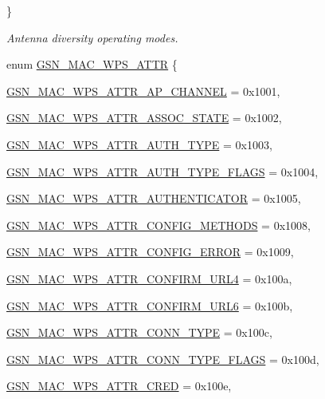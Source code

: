 \begin{DoxyCompactItemize}
 \}
\begin{DoxyCompactList}\small\item\em Antenna diversity operating modes. \end{DoxyCompactList}\item 
enum \hyperlink{a00642_ga0ae19d69a0b381d883890df8a7812414}{GSN\_\-MAC\_\-WPS\_\-ATTR} \{ \par
\hyperlink{a00642_gga0ae19d69a0b381d883890df8a7812414ae0e4f98b1e9f93fab112823a40124cf9}{GSN\_\-MAC\_\-WPS\_\-ATTR\_\-AP\_\-CHANNEL} =  0x1001, 
\par
\hyperlink{a00642_gga0ae19d69a0b381d883890df8a7812414a14a9ece3989389a193ba8952c6e54a49}{GSN\_\-MAC\_\-WPS\_\-ATTR\_\-ASSOC\_\-STATE} =  0x1002, 
\par
\hyperlink{a00642_gga0ae19d69a0b381d883890df8a7812414a82abc540504b8e5abd3d3284d1be3691}{GSN\_\-MAC\_\-WPS\_\-ATTR\_\-AUTH\_\-TYPE} =  0x1003, 
\par
\hyperlink{a00642_gga0ae19d69a0b381d883890df8a7812414a82a50e93477f656efe36c78bee9853ae}{GSN\_\-MAC\_\-WPS\_\-ATTR\_\-AUTH\_\-TYPE\_\-FLAGS} =  0x1004, 
\par
\hyperlink{a00642_gga0ae19d69a0b381d883890df8a7812414a6db708b7b9456aa0954847a56a87c950}{GSN\_\-MAC\_\-WPS\_\-ATTR\_\-AUTHENTICATOR} =  0x1005, 
\par
\hyperlink{a00642_gga0ae19d69a0b381d883890df8a7812414a0b8df95e03afe854134675a191b32380}{GSN\_\-MAC\_\-WPS\_\-ATTR\_\-CONFIG\_\-METHODS} =  0x1008, 
\par
\hyperlink{a00642_gga0ae19d69a0b381d883890df8a7812414a11665e3ac538b48a4c5cd07c7f85ac34}{GSN\_\-MAC\_\-WPS\_\-ATTR\_\-CONFIG\_\-ERROR} =  0x1009, 
\par
\hyperlink{a00642_gga0ae19d69a0b381d883890df8a7812414a58e52e468a71edde980771bdcc5cb57c}{GSN\_\-MAC\_\-WPS\_\-ATTR\_\-CONFIRM\_\-URL4} =  0x100a, 
\par
\hyperlink{a00642_gga0ae19d69a0b381d883890df8a7812414a8196c29bf558c99d22a89a2821eeddd7}{GSN\_\-MAC\_\-WPS\_\-ATTR\_\-CONFIRM\_\-URL6} =  0x100b, 
\par
\hyperlink{a00642_gga0ae19d69a0b381d883890df8a7812414acde288264ac04d778a3253db30d27606}{GSN\_\-MAC\_\-WPS\_\-ATTR\_\-CONN\_\-TYPE} =  0x100c, 
\par
\hyperlink{a00642_gga0ae19d69a0b381d883890df8a7812414a860213d76ac7a737ae6526d4ede0972b}{GSN\_\-MAC\_\-WPS\_\-ATTR\_\-CONN\_\-TYPE\_\-FLAGS} =  0x100d, 
\par
\hyperlink{a00642_gga0ae19d69a0b381d883890df8a7812414af801b5a3d9b7781b514c52ff1d95046e}{GSN\_\-MAC\_\-WPS\_\-ATTR\_\-CRED} =  0x100e, 

\end{DoxyCompactItemize}
